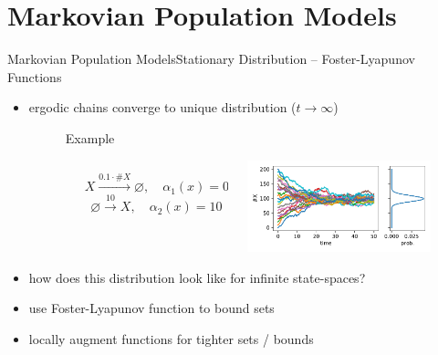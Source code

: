 \documentclass[10pt]{beamer}
\begin{document}
\section{Markovian Population Models}
\begin{frame}{Markovian Population Models}{Stationary Distribution -- Foster-Lyapunov Functions}
    \begin{itemize}
        \item ergodic chains converge to unique distribution ($t\to\infty$)
    \begin{figure}
        \begin{exampleblock}{Example}
        \begin{columns}
            \begin{column}{.05\paperwidth}\end{column}
            \begin{column}{.33\paperwidth}
                \vspace{-5mm}
                $$ {\scriptstyle X\xrightarrow{0.1\cdot \#X} \varnothing, \quad \alpha_1(x)=0.1 x } $$
                $$ {\scriptstyle \varnothing\xrightarrow{10} X, \quad \alpha_2(x) = 10 } $$
                \vfill
            \end{column}
            \begin{column}{.6\paperwidth}
                \includegraphics[width=6cm]{../gfx/stationary_dist.pdf}
            \end{column}
        \end{columns}
        \end{exampleblock}
    \end{figure}
        \item how does this distribution look like for infinite state-spaces?
        \item use Foster-Lyapunov function to bound sets
        \item locally augment functions for tighter sets / bounds
    \end{itemize}
\end{frame}
\end{document}
